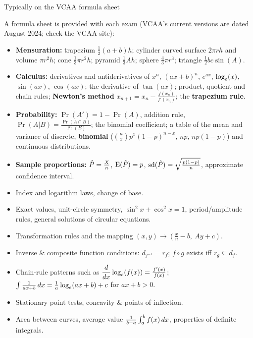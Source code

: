 \begin{cols}
\begin{keyres}{Typically on the VCAA formula sheet}
{\small A formula sheet is provided with each exam (VCAA's current versions are dated August 2024; check the VCAA site):
\begin{itemize}
  \item \textbf{Mensuration:} trapezium $\tfrac12(a+b)h$; cylinder curved surface $2\pi rh$ and volume $\pi r^2h$; cone $\tfrac13\pi r^2h$; pyramid $\tfrac13Ah$; sphere $\tfrac43\pi r^3$; triangle $\tfrac12bc\sin(A)$.
  \item \textbf{Calculus:} derivatives and antiderivatives of $x^n$, $(ax+b)^n$, $e^{ax}$, $\log_e(x)$, $\sin(ax)$, $\cos(ax)$; the derivative of $\tan(ax)$; product, quotient and chain rules; \textbf{Newton's method} $x_{n+1}=x_n-\frac{f(x_n)}{f'(x_n)}$; the \textbf{trapezium rule}.
  \item \textbf{Probability:} $\Pr(A')=1-\Pr(A)$, addition rule, $\Pr(A|B)=\frac{\Pr(A\cap B)}{\Pr(B)}$; the binomial coefficient; a table of the mean and variance of discrete, \textbf{binomial} ($\binom nx p^x(1-p)^{n-x}$, $np$, $np(1-p)$) and continuous distributions.
  \item \textbf{Sample proportions:} $\hat{P}=\frac{X}{n}$, $\mathrm{E}(\hat{P})=p$, $\mathrm{sd}(\hat{P})=\sqrt{\frac{p(1-p)}{n}}$, approximate confidence interval.
\end{itemize}}
\end{keyres}
\nextcol
\begin{warn}
{\small\begin{itemize}
  \item Index and logarithm laws, change of base.
  \item Exact values, unit-circle symmetry, $\sin^2x+\cos^2x=1$, period/amplitude rules, general solutions of circular equations.
  \item Transformation rules and the mapping $(x,y)\to\left(\frac{x}{n}-b,\ Ay+c\right)$.
  \item Inverse \& composite function conditions: $d_{f^{-1}}=r_f$; $f\circ g$ exists iff $r_g\subseteq d_f$.
  \item Chain-rule patterns such as $\dfrac{d}{dx} \log_e(f(x))=\frac{f'(x)}{f(x)}$; $\int\frac{1}{ax+b}\,dx=\frac1a\log_e(ax+b)+c$ for $ax+b>0$.
  \item Stationary point tests, concavity \& points of inflection.
  \item Area between curves, average value $\frac{1}{b-a}\int_a^b f(x)\,dx$, properties of definite integrals.

\end{itemize}}
\end{warn}
\end{cols}
